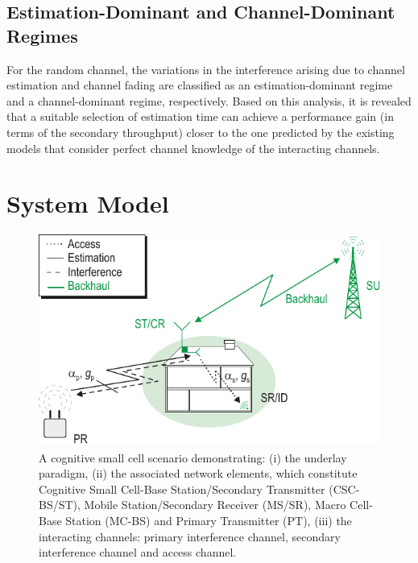 \subsection{Estimation-Dominant and Channel-Dominant Regimes}
For the random channel, the variations in the interference arising due to channel estimation and channel fading are classified as an estimation-dominant regime and a channel-dominant regime, respectively. Based on this analysis, it is revealed that a suitable selection of estimation time can achieve a performance gain (in terms of the secondary throughput) closer to the one predicted by the existing models that consider perfect channel knowledge of the interacting channels.


\section{System Model} \label{sec_US:sys_mod}
\begin{figure}[!ht]
\centering
\includegraphics[width = \figscalet]{figures/CR_Scenario_Underlay}
\caption{A cognitive small cell scenario demonstrating: (i) the underlay paradigm, (ii) the associated network elements, which constitute Cognitive Small Cell-Base Station/Secondary Transmitter (CSC-BS/ST), Mobile Station/Secondary Receiver (MS/SR), Macro Cell-Base Station (MC-BS) and Primary Transmitter (PT), (iii) the interacting channels: primary interference channel, secondary interference channel and access channel.}
\label{fig_US:scenario}
\end{figure}


